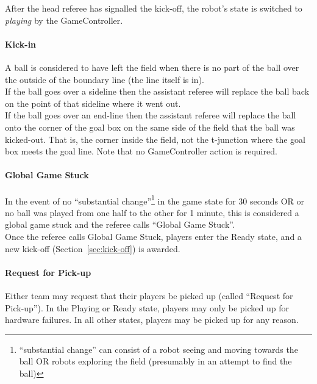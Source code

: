 After the head referee has signalled the kick-off, the robot's state is switched to \emph{playing} by the GameController.

\paragraph{Kick-in}
\label{sec:kick_in}

A ball is considered to have left the field when there is no part of the ball over the outside of the boundary line (\ie the line itself is in). \\
If the ball goes over a sideline then the assistant referee will replace the ball back on the point of that sideline where it went out. \\
If the ball goes over an end-line then the assistant referee will replace the ball onto the corner of the goal box on the same side of the field that the ball was kicked-out. That is, the corner inside the field, not the t-junction where the goal box meets the goal line.
Note that no GameController action is required.

\paragraph{Global Game Stuck}
\label{sec:game_stuck:global}

In the event of no ``substantial change''\footnote{``substantial change'' can consist of a robot seeing and moving towards the ball OR robots exploring the field (presumably in an attempt to find the ball)} in the game state for 30 seconds OR or no ball was played from one half to the other for 1 minute, this is considered a global game stuck and the referee calls ``Global Game Stuck''. \\
Once the referee calls Global Game Stuck, players enter the Ready state, and a new kick-off (\cf Section~\ref{sec:kick-off}) is awarded.


\paragraph{Request for Pick-up}
\label{sec:request_for_pickup}

Either team may request that their players be picked up (called ``Request for Pick-up'').
In the Playing or Ready state, players may only be picked up for hardware failures.
In all other states, players may be picked up for any reason.

